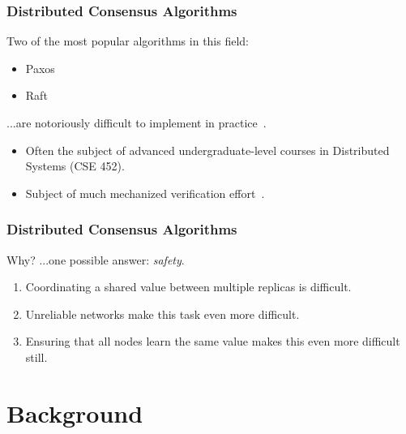 \documentclass[aspectratio=169,compress,handout]{beamer}
\begin{document}
  \begin{frame}
    \frametitle{Distributed Consensus Algorithms}
    Two of the most popular algorithms in this field:
    \begin{itemize}
      \item Paxos~\citep{lamport98}
      \item Raft~\citep{ongaro14}
    \end{itemize}
    \pause
    ...are notoriously difficult to implement in practice~\citep{howard20}.
    \begin{itemize}
      \item<3-> Often the subject of advanced undergraduate-level courses in
        Distributed Systems (CSE 452).
      \item<4-> Subject of much mechanized verification
        effort~\citep{wilcox15,woos16}.
    \end{itemize}
  \end{frame}

  \begin{frame}
    \frametitle{Distributed Consensus Algorithms}
    Why?
    \pause
    ...one possible answer: \emph{safety}.
    \begin{enumerate}[<+->]
      \item Coordinating a shared value between multiple replicas is difficult.
      \item Unreliable networks make this task even more difficult.
      \item Ensuring that all nodes learn the same value makes this even more
        difficult still.
    \end{enumerate}
  \end{frame}

  \section{Background}
\end{document}
